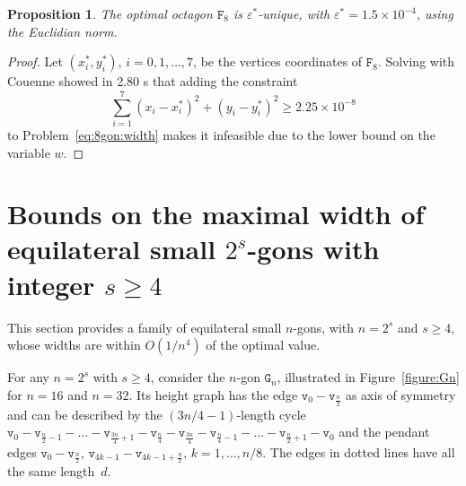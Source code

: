 \documentclass[a4paper,12pt]{article}
\theoremstyle{definition}
\theoremstyle{plain}
\newtheorem{proposition}{Proposition}
\newcommand{\geo}[1]{\mathtt{#1}}
\begin{document}
\begin{proposition}
	The optimal octagon $\geo{F}_8$ is $\varepsilon^*$-unique, with $\varepsilon^* = 1.5 \times 10^{-4}$, using the Euclidian norm.
\end{proposition}
\begin{proof}
	Let $(x_i^*,y_i^*)$, $i = 0,1,\ldots,7$, be the vertices coordinates of $\geo{F}_8$. Solving with Couenne showed in 2.80 s that adding the constraint
	\[
	\sum_{i=1}^{7} (x_i - x_i^*)^2 + (y_i - y_i^*)^2 \ge 2.25 \times 10^{-8}
	\]
	to Problem~\eqref{eq:8gon:width} makes it infeasible due to the lower bound on the variable $w$.
\end{proof}

\section{Bounds on the maximal width of equilateral small $2^s$-gons with integer $s \ge 4$}\label{sec:Gn}
This section provides a family of equilateral small $n$-gons, with $n=2^s$ and $s\ge 4$, whose widths are within $O(1/n^4)$ of the optimal value.

For any $n=2^s$ with $s\ge 4$, consider the $n$-gon $\geo{G}_n$, illustrated in Figure~\ref{figure:Gn} for $n=16$ and $n=32$. Its height graph has the edge $\geo{v}_0-\geo{v}_{\frac{n}{2}}$ as axis of symmetry and can be described by  the $(3n/4-1)$-length cycle $\geo{v}_0 - \geo{v}_{\frac{n}{2}-1} - \ldots - \geo{v}_{\frac{3n}{4}+1} - \geo{v}_{\frac{n}{4}} - \geo{v}_{\frac{3n}{4}} - \geo{v}_{\frac{n}{4}-1} - \ldots - \geo{v}_{\frac{n}{2}+1} - \geo{v}_0$ and the pendant edges $\geo{v}_0 - \geo{v}_{\frac{n}{2}}$, $\geo{v}_{4k-1} - \geo{v}_{4k-1+\frac{n}{2}}$, $k=1,\ldots,n/8$. The edges in dotted lines have all the same length~$d$.
\end{document}
